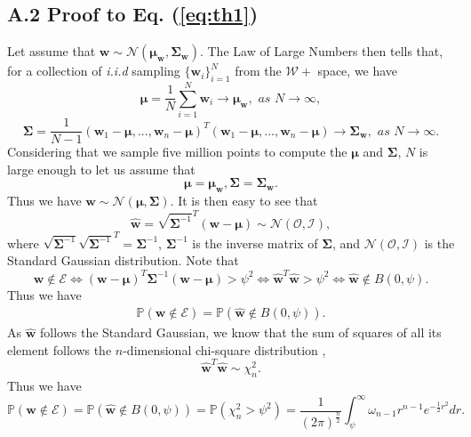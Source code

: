 \documentclass[10pt,twocolumn,letterpaper]{article}
\newcommand{\w}{\bm{w}}
\begin{document}
\subsection*{A.2 Proof to Eq. (\ref{eq:th1})}
Let assume that $\w\sim \mathcal{N}(\bm{\mu}_{\w},\bm{\Sigma}_{\w})$. The Law of Large Numbers \cite{chung2001course} then tells that, for a collection of \textit{i.i.d} sampling $\{\w_i\}_{i=1}^N$ from the $\mathcal{W}+$ space, we have
\begin{equation}
    \bm{\mu}=\frac{1}{N}\sum_{i=1}^N\w_i \rightarrow \bm{\mu}_{\w},\,\,as\,\,N\rightarrow\infty,
\end{equation}
\begin{equation}
    \bm{\Sigma}=\frac{1}{N-1}(\w_1-\bm{\mu},...,\w_n-\bm{\mu})^T(\w_1-\bm{\mu},...,\w_n-\bm{\mu})\rightarrow \bm{\Sigma}_{\w},\,\,as\,\,N\rightarrow\infty.
\end{equation}
Considering that we sample five million points to compute the $\bm{\mu}$ and $\bm{\Sigma}$, $N$ is large enough to let us assume that 
\begin{equation}
    \bm{\mu}=\bm{\mu}_{\w},\bm{\Sigma}=\bm{\Sigma}_{\w}.
\end{equation}
Thus we have $\w\sim\mathcal{N}(\bm{\mu},\bm{\Sigma})$. It is then easy to see that
\begin{equation}
    \hat{\w}=\sqrt{\bm{\Sigma}^{-1}}^T(\w-\bm{\mu})\sim \mathcal{N}(\mathcal{O},\mathcal{I}),
\end{equation}
where $\sqrt{\bm{\Sigma}^{-1}}\sqrt{\bm{\Sigma}^{-1}}^T=\bm{\Sigma}^{-1}$, $\bm{\Sigma}^{-1}$ is the inverse matrix of $\bm{\Sigma}$, and $\mathcal{N}(\mathcal{O},\mathcal{I})$ is the Standard Gaussian distribution.
Note that
\begin{equation}
     \w\notin\mathcal{E}\Leftrightarrow(\w-\bm{\mu})^T\bm{\Sigma}^{-1}(\w-\bm{\mu})>\psi^2\Leftrightarrow \hat{\w}^T\hat{\w}>\psi^2\Leftrightarrow \hat{\w}\notin B(0,\psi).
\end{equation}
Thus we have
\begin{gather}
    \mathbb{P}(\w\notin\mathcal{E})=\mathbb{P}(\hat{\w}\notin B(0,\psi)).
\end{gather}
As $\hat{\w}$ follows the Standard Gaussian, we know that the sum of squares of all its element follows the $n$-dimensional chi-square distribution \cite{chung2001course,lancaster2005chi},
\begin{equation}
    \hat{\w}^T\hat{\w}\sim \chi_n^2.
\end{equation}
Thus we have 
\begin{equation}
    \mathbb{P}(\w\notin\mathcal{E})=\mathbb{P}(\hat{\w}\notin B(0,\psi))=\mathbb{P}(\chi_n^2>\psi^2)=\frac{1}{(2\pi)^{\frac{n}{2}}}\int_{\psi}^{\infty}\omega_{n-1}r^{n-1}e^{-\frac{1}{2}r^2}dr.
\end{equation}
\end{document}
